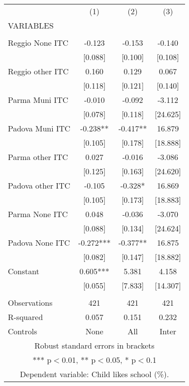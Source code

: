 \begin{tabular}{lccc} \hline
 & (1) & (2) & (3) \\
VARIABLES &  &  &  \\ \hline
 &  &  &  \\
Reggio None ITC & -0.123 & -0.153 & -0.140 \\
 & [0.088] & [0.100] & [0.108] \\
Reggio other ITC & 0.160 & 0.129 & 0.067 \\
 & [0.118] & [0.121] & [0.140] \\
Parma Muni ITC & -0.010 & -0.092 & -3.112 \\
 & [0.078] & [0.118] & [24.625] \\
Padova Muni ITC & -0.238** & -0.417** & 16.879 \\
 & [0.105] & [0.178] & [18.888] \\
Parma other ITC & 0.027 & -0.016 & -3.086 \\
 & [0.125] & [0.163] & [24.620] \\
Padova other ITC & -0.105 & -0.328* & 16.869 \\
 & [0.105] & [0.173] & [18.883] \\
Parma None ITC & 0.048 & -0.036 & -3.070 \\
 & [0.088] & [0.134] & [24.624] \\
Padova None ITC & -0.272*** & -0.377** & 16.875 \\
 & [0.082] & [0.147] & [18.882] \\
Constant & 0.605*** & 5.381 & 4.158 \\
 & [0.055] & [7.833] & [14.307] \\
 &  &  &  \\
Observations & 421 & 421 & 421 \\
R-squared & 0.057 & 0.151 & 0.232 \\
 Controls & None & All & Inter \\ \hline
\multicolumn{4}{c}{ Robust standard errors in brackets} \\
\multicolumn{4}{c}{ *** p$<$0.01, ** p$<$0.05, * p$<$0.1} \\
\multicolumn{4}{c}{ Dependent variable: Child likes school (\%).} \\
\end{tabular}
